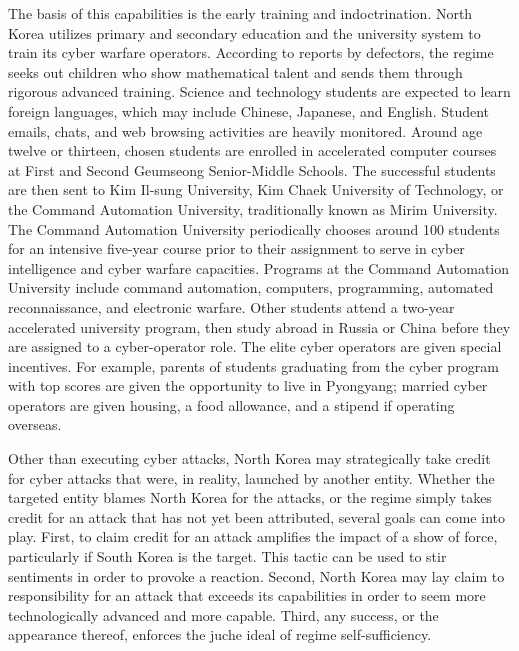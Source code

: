 \documentclass[12pt]{article}
\begin{document}
        The basis of this capabilities is the early training and indoctrination. North Korea utilizes primary and secondary education and the university system to train its cyber warfare operators. According to reports by defectors, the regime seeks out children who show mathematical talent and sends them through rigorous advanced training. Science and technology students are expected to learn foreign languages, which may include Chinese, Japanese, and English. Student emails, chats, and web browsing activities are heavily monitored. Around age twelve or thirteen, chosen students are enrolled in accelerated computer courses at First and Second Geumseong Senior-Middle Schools. The successful students are then sent to Kim Il-sung University, Kim Chaek University of Technology, or the Command Automation University, traditionally known as Mirim University. The Command Automation University periodically chooses around 100 students for an intensive five-year course prior to their assignment to serve in cyber intelligence and cyber warfare capacities. Programs at the Command Automation University include command automation, computers, programming, automated reconnaissance, and electronic warfare. Other students attend a two-year accelerated university program, then study abroad in Russia or China before they are assigned to a cyber-operator role. The elite cyber operators are given special incentives. For example, parents of students graduating from the cyber program with top scores are given the opportunity to live in Pyongyang; married cyber operators are given housing, a food allowance, and a stipend if operating overseas.
        
        Other than executing cyber attacks, North Korea may strategically take credit for cyber attacks that were, in reality, launched by another entity. Whether the targeted entity blames North Korea for the attacks, or the regime simply takes credit for an attack that has not yet been attributed, several goals can come into play. First, to claim credit for an attack amplifies the impact of a show of force, particularly if South Korea is the target. This tactic can be used to stir sentiments in order to provoke a reaction. Second, North Korea may lay claim to responsibility for an attack that exceeds its capabilities in order to seem more technologically advanced and more capable. Third, any success, or the appearance thereof, enforces the juche ideal of regime self-sufficiency.\cite{LazarusConstellation}\cite{ProfilingEnigmaMystery}
        
 
        
\end{document}
